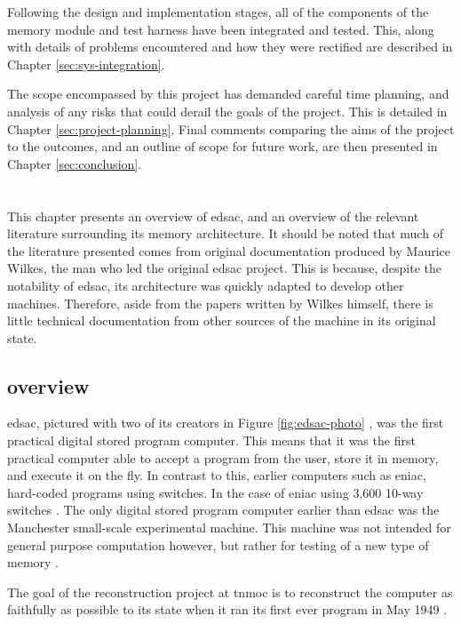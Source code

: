 Following the design and implementation stages, all of the components of the memory module and test harness have been integrated and tested. This, along with details of problems encountered and how they were rectified are described in Chapter \ref{sec:sys-integration}.

The scope encompassed by this project has demanded careful time planning, and analysis of any risks that could derail the goals of the project. This is detailed in Chapter \ref{sec:project-planning}. Final comments comparing the aims of the project to the outcomes, and an outline of scope for future work, are then presented in Chapter \ref{sec:conclusion}.

\chapter{} \label{sec:tech-rev}
This chapter presents an overview of \gls{edsac}, and an overview of the relevant literature surrounding its memory architecture. It should be noted that much of the literature presented comes from original documentation produced by Maurice Wilkes, the man who led the original \gls{edsac} project. This is because, despite the notability of \gls{edsac}, its architecture was quickly adapted to develop other machines. Therefore, aside from the papers written by Wilkes himself, there is little technical documentation from other sources of the machine in its original state.

\section{ overview} \label{sec:edsac-overview}
\Gls{edsac}, pictured with two of its creators in Figure \ref{fig:edsac-photo} \cite{cam2011}, was the first practical digital stored program computer. This means that it was the first practical computer able to accept a program from the user, store it in memory, and execute it on the fly. In contrast to this, earlier computers such as \gls{eniac}, hard-coded programs using switches. In the case of \gls{eniac} using 3,600 10-way switches \cite{cruz2013}. The only digital stored program computer earlier than \gls{edsac} was the Manchester small-scale experimental machine. This machine was not intended for general purpose computation however, but rather for testing of a new type of memory \cite{jones2001}.

The goal of the reconstruction project at \gls{tnmoc} is to reconstruct the computer as faithfully as possible to its state when it ran its first ever program in May 1949 \cite{nmoc2017}.


